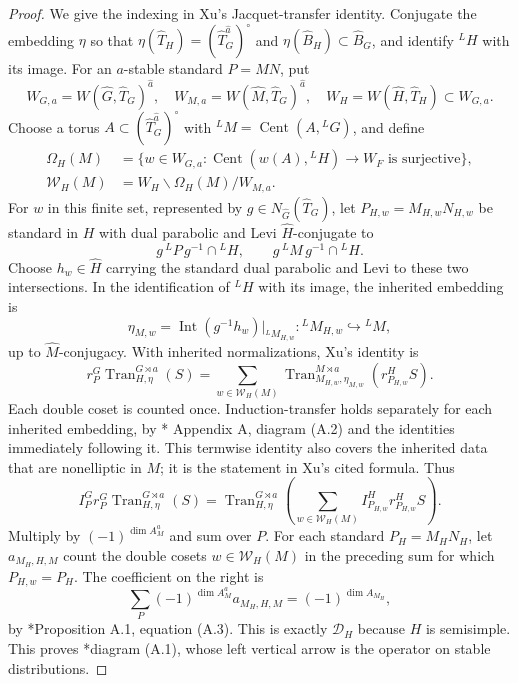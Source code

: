 \documentclass[12pt]{amsart}
\theoremstyle{definition}
\theoremstyle{plain}
\theoremstyle{remark}
\DeclareMathOperator{\Cent}{Cent}%
\numberwithin{equation}{section}
\begin{document}
\begin{proof}
We give the indexing in Xu's Jacquet-transfer identity.
Conjugate the embedding $\eta$ so that
$\eta(\widehat T_H)=(\widehat T_G^{\widehat a})^\circ$
and $\eta(\widehat B_H)\subset\widehat B_G$, and identify ${}^LH$
with its image. For an $a$-stable standard $P=MN$, put
\[
 W_{G, a}=W(\widehat G,\widehat T_G)^{\widehat a},
 \quad W_{M,a}=W(\widehat M,\widehat T_G)^{\widehat a},
 \quad W_H=W(\widehat H,\widehat T_H)\subset W_{G, a}.
\]
Choose a torus $A\subset(\widehat T_G^{\widehat a})^\circ$
with ${}^LM=\Cent(A,{}^LG)$, and define
\[
 \begin{aligned}
 \Omega_H(M)&=\{w\in W_{G, a}:
       \Cent(w(A),{}^LH)\longrightarrow W_F\text{ is surjective}\},\\
 \mathcal W_H(M)&=W_H\backslash\Omega_H(M)/W_{M,a}.
 \end{aligned}
\]
For $w$ in this finite set, represented by
$g\in N_{\widehat G}(\widehat T_G)$, let
$P_{H,w}=M_{H,w}N_{H,w}$ be standard in $H$ with dual parabolic
and Levi $\widehat H$-conjugate to
\[
 g\,{}^LP\,g^{-1}\cap{}^LH,
 \qquad g\,{}^LM\,g^{-1}\cap{}^LH.
\]
Choose $h_w\in\widehat H$ carrying the standard dual parabolic
and Levi to these two intersections. In the identification of ${}^LH$
with its image, the inherited embedding is
\[
 \eta_{M,w}=\operatorname{Int}(g^{-1}h_w)|_{{}^LM_{H,w}}:
                   {}^LM_{H,w}\hookrightarrow{}^LM,
\]
up to $\widehat M$-conjugacy. With inherited normalizations, Xu's identity is
\[
 r_P^G\operatorname{Tran}_{H,\eta}^{G \rtimes a}(S)
  =\sum_{w\in\mathcal W_H(M)}
     \operatorname{Tran}_{M_{H,w},\eta_{M,w}}^{M\rtimes a}
                       (r_{P_{H,w}}^H S).
\]
Each double coset is counted once. Induction-transfer holds separately
for each inherited embedding, by
\cite{Xu2017-MoeglinParametrizationArthurPackets}*{
Appendix A, diagram (A.2) and the identities immediately following it}.
This termwise identity also covers the inherited data that are
nonelliptic in $M$; it is the statement in Xu's cited formula.
Thus
\[
 I_P^G r_P^G\operatorname{Tran}_{H,\eta}^{G \rtimes a}(S)
  =\operatorname{Tran}_{H,\eta}^{G \rtimes a}
       \left(\sum_{w\in\mathcal W_H(M)}
                     I_{P_{H,w}}^H r_{P_{H,w}}^H S\right).
\]
Multiply by $(-1)^{\dim A_M^a}$ and sum over $P$.
For each standard $P_H=M_HN_H$, let $a_{M_H,H,M}$ count the
double cosets $w\in\mathcal W_H(M)$ in the preceding sum for which
$P_{H,w}=P_H$. The coefficient on the right is
\[
 \sum_P(-1)^{\dim A_M^a}a_{M_H,H,M}
       =(-1)^{\dim A_{M_H}},
\]
by \cite{Xu2017-MoeglinParametrizationArthurPackets}*{Proposition A.1, equation (A.3)}.
This is exactly $\mathcal D_H$ because $H$ is semisimple. This proves
\cite{Xu2017-MoeglinParametrizationArthurPackets}*{diagram (A.1)},
whose left vertical arrow is the operator on stable distributions.
\end{proof}
\end{document}
